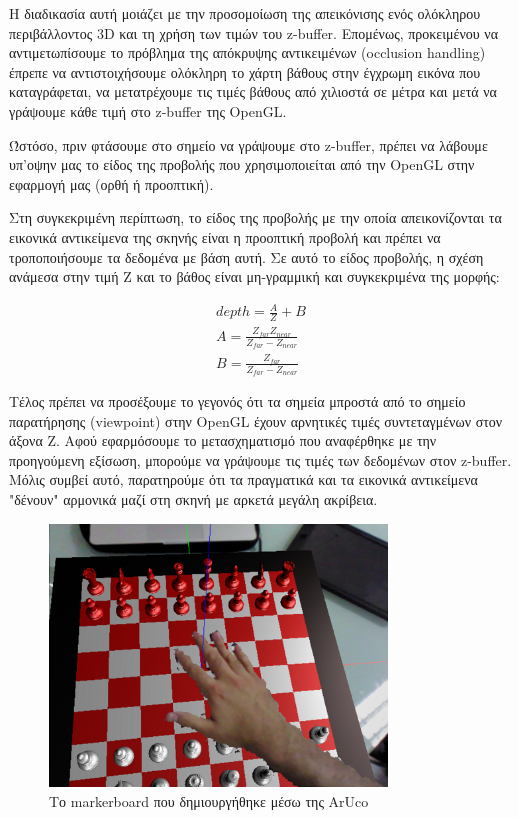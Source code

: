 Η διαδικασία αυτή μοιάζει με την προσομοίωση της απεικόνισης ενός ολόκληρου περιβάλλοντος 3D και τη χρήση των τιμών του z-buffer. Eπομένως, προκειμένου να αντιμετωπίσουμε το πρόβλημα της απόκρυψης αντικειμένων (occlusion handling) έπρεπε να αντιστοιχήσουμε ολόκληρη το χάρτη βάθους στην έγχρωμη εικόνα που καταγράφεται, να μετατρέχουμε τις τιμές βάθους από χιλιοστά σε μέτρα και μετά να γράψουμε κάθε τιμή στο z-buffer της OpenGL.


Ώστόσο, πριν φτάσουμε στο σημείο να γράψουμε στο z-buffer, πρέπει να λάβουμε υπ'οψην μας το είδος της προβολής που χρησιμοποιείται από την OpenGL στην εφαρμογή μας (ορθή ή προοπτική). 


Στη συγκεκριμένη περίπτωση, το είδος της προβολής με την οποία απεικονίζονται τα εικονικά αντικείμενα της σκηνής είναι η προοπτική προβολή και πρέπει να τροποποιήσουμε τα δεδομένα με βάση αυτή. Σε αυτό το είδος προβολής, η σχέση ανάμεσα στην τιμή Z και το βάθος είναι μη-γραμμική και συγκεκριμένα της μορφής:



\begin{equation}
\begin{aligned}
depth=\frac{A}{Z}+B \\
A=\frac{Z_{far}Z_{near}}{Z_{far}-Z_{near}}\\ B=\frac{Z_{far}}{Z_{far}-Z_{near}}
\end{aligned}
\end{equation}

Τέλος πρέπει να προσέξουμε το γεγονός ότι τα σημεία μπροστά από το σημείο παρατήρησης (viewpoint) στην OpenGL έχουν αρνητικές τιμές συντεταγμένων στον άξονα Z. Αφού εφαρμόσουμε το μετασχηματισμό που αναφέρθηκε με την προηγούμενη εξίσωση, μπορούμε να γράψουμε τις τιμές των δεδομένων στον z-buffer. Μόλις συμβεί αυτό, παρατηρούμε ότι τα πραγματικά και τα εικονικά αντικείμενα "δένουν" αρμονικά μαζί στη σκηνή με αρκετά μεγάλη ακρίβεια. 



\begin{figure}[H]
    \centering
    \includegraphics[width=0.8\textwidth]{Files/Figures/occlusion2.png}
    \caption[Το markerboard που δημιουργήθηκε μέσω της ArUco]{Το markerboard που δημιουργήθηκε μέσω της ArUco}
    \label{fig:occlusion}
\end{figure}



